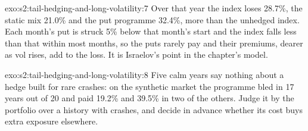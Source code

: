 \begin{solution}{exo:s2:tail-hedging-and-long-volatility:7}
Over that year the index loses 28.7\%, the static mix 21.0\% and the put programme 32.4\%, more than the unhedged index. Each month's put is struck
5\% below that month's start and the index falls less than that within most months, so the puts rarely pay and their premiums, dearer as vol rises,
add to the loss. It is Israelov's point in the chapter's model.
\end{solution}

\begin{solution}{exo:s2:tail-hedging-and-long-volatility:8}
Five calm years say nothing about a hedge built for rare crashes: on the synthetic market the programme bled in 17 years out of 20 and paid 19.2\% and
39.5\% in two of the others. Judge it by the portfolio over a history with crashes, and decide in advance whether its cost buys extra exposure
elsewhere.
\end{solution}

